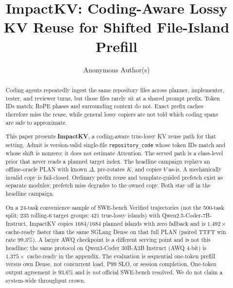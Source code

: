 \documentclass[sigplan,anonymous,review,nonacm]{acmart}
\title{ImpactKV: Coding-Aware Lossy KV Reuse for Shifted File-Island Prefill}
\author{Anonymous Author(s)}
\affiliation{%
  \institution{Anonymous Institution}
  \country{}
}
\newcommand{\method}{ImpactKV}
\begin{document}
\begin{abstract}
Coding agents repeatedly ingest the same repository files across planner,
implementer, tester, and reviewer turns, but those files rarely sit at a
shared prompt prefix. Token IDs match; RoPE phases and surrounding context
do not. Exact prefix caches therefore miss the reuse, while general lossy
copiers are not told which coding spans are safe to approximate.

This paper presents \textbf{\method{}}, a coding-aware true-lossy KV reuse
path for that setting. Admit is version-valid single-file
\texttt{repository\_code} whose token IDs match and whose shift is
nonzero; it does not estimate Attention. The served path is a class-level
prior that never reads a planned target index. The headline campaign
replays an offline-oracle PLAN with known $\Delta$, pre-rotates $K$, and
copies $V$ as-is. A mechanically invalid copy is fail-closed. Ordinary
prefix reuse and template-guided prefetch exist as separate modules;
prefetch miss degrades to the owned copy. Both stay off in the headline
campaign.

On a 24-task convenience sample of SWE-bench Verified trajectories
(not the 500-task split; 235 rolling-6 target groups; 421 true-lossy
islands) with Qwen2.5-Coder-7B-Instruct, \method{} copies $1684/1684$
planned islands with zero fallback and is $1.492\times$ cache-ready faster
than the same SGLang Dense on that full PLAN (paired TTFT win rate
$99.3\%$). A larger AWQ
checkpoint is a different serving point and is not this headline: the
same protocol on Qwen3-Coder 30B-A3B Instruct (AWQ 4-bit) is
$1.375\times$ cache-ready in the appendix. The evaluation is
sequential one-token prefill versus own Dense, not concurrent load,
P99 SLO, or session completion. One-token output agreement is
$93.6\%$ and is \emph{not} official SWE-bench resolved. We do not
claim a system-wide throughput crown.
\end{abstract}

\maketitle












\appendix

\clearpage



\end{document}
